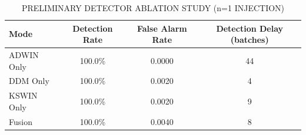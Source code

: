 \begin{table}[htbp]
\caption{PRELIMINARY DETECTOR ABLATION STUDY (n=1 INJECTION)}
\label{tab:detector_ablation}
\centering
\begin{tabular}{@{}lccc@{}}
\toprule
\textbf{Mode} & \textbf{Detection Rate} & \textbf{False Alarm Rate} & \textbf{Detection Delay (batches)} \\ \midrule
ADWIN Only & 100.0\% & 0.0000 & 44 \\
DDM Only & 100.0\% & 0.0020 & 4 \\
KSWIN Only & 100.0\% & 0.0020 & 9 \\
Fusion & 100.0\% & 0.0040 & 8 \\
\bottomrule
\end{tabular}
\end{table}
